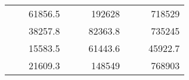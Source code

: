 \begin{table}[H]
\begin{tabular}{|ccrccrccc}
\rowcolor[HTML]{DDFDFF} 
\multicolumn{1}{|c|}{\cellcolor[HTML]{FFFFC7}}                                & \multicolumn{1}{c|}{\cellcolor[HTML]{DDFDFF}}                      & \multicolumn{1}{r|}{\cellcolor[HTML]{DAE8FC}61856.5}   & \multicolumn{1}{c|}{\cellcolor[HTML]{FFFFC7}}                                & \multicolumn{1}{c|}{\cellcolor[HTML]{DDFDFF}}                       & \multicolumn{1}{r|}{\cellcolor[HTML]{DDFDFF}192628}    & \multicolumn{1}{c|}{\cellcolor[HTML]{FFFFC7}}                                & \multicolumn{1}{c|}{\cellcolor[HTML]{DDFDFF}}                      & \multicolumn{1}{r|}{\cellcolor[HTML]{DDFDFF}718529}    \\ \cline{3-3} \cline{6-6} \cline{9-9} 
\multicolumn{1}{|c|}{\cellcolor[HTML]{FFFFC7}}                                & \multicolumn{1}{c|}{\cellcolor[HTML]{DDFDFF}}                      & \multicolumn{1}{r|}{\cellcolor[HTML]{DDFDFF}38257.8}   & \multicolumn{1}{c|}{\cellcolor[HTML]{FFFFC7}}                                & \multicolumn{1}{c|}{\cellcolor[HTML]{DDFDFF}}                       & \multicolumn{1}{r|}{\cellcolor[HTML]{DAE8FC}82363.8}   & \multicolumn{1}{c|}{\cellcolor[HTML]{FFFFC7}}                                & \multicolumn{1}{c|}{\cellcolor[HTML]{DDFDFF}}                      & \multicolumn{1}{r|}{\cellcolor[HTML]{DAE8FC}735245}    \\ \cline{3-3} \cline{6-6} \cline{9-9} 
\rowcolor[HTML]{DDFDFF} 
\multicolumn{1}{|c|}{\cellcolor[HTML]{FFFFC7}}                                & \multicolumn{1}{c|}{\cellcolor[HTML]{DDFDFF}}                      & \multicolumn{1}{r|}{\cellcolor[HTML]{DAE8FC}15583.5}   & \multicolumn{1}{c|}{\cellcolor[HTML]{FFFFC7}}                                & \multicolumn{1}{c|}{\cellcolor[HTML]{DDFDFF}}                       & \multicolumn{1}{r|}{\cellcolor[HTML]{DDFDFF}61443.6}   & \multicolumn{1}{c|}{\cellcolor[HTML]{FFFFC7}}                                & \multicolumn{1}{c|}{\cellcolor[HTML]{DDFDFF}}                      & \multicolumn{1}{r|}{\cellcolor[HTML]{DDFDFF}45922.7}   \\ \cline{3-3} \cline{6-6} \cline{9-9} 
\multicolumn{1}{|c|}{\cellcolor[HTML]{FFFFC7}}                                & \multicolumn{1}{c|}{\cellcolor[HTML]{DDFDFF}}                      & \multicolumn{1}{r|}{\cellcolor[HTML]{DDFDFF}21609.3}   & \multicolumn{1}{c|}{\cellcolor[HTML]{FFFFC7}}                                & \multicolumn{1}{c|}{\cellcolor[HTML]{DDFDFF}}                       & \multicolumn{1}{r|}{\cellcolor[HTML]{DAE8FC}148549}    & \multicolumn{1}{c|}{\cellcolor[HTML]{FFFFC7}}                                & \multicolumn{1}{c|}{\cellcolor[HTML]{DDFDFF}}                      & \multicolumn{1}{r|}{\cellcolor[HTML]{DAE8FC}768903}    \\ \cline{3-3} \cline{6-6} \cline{9-9} 

\end{tabular}
\end{table}
